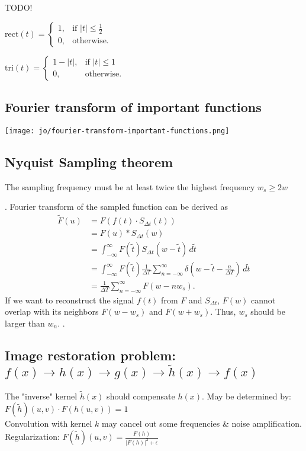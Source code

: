 TODO!

$\text{rect}(t) = \begin{cases} 1, & \text{if } |t| \leq \frac{1}{2} \\ 0, & \text{otherwise.} \end{cases}$

$\text{tri}(t) = \begin{cases} 1 - |t|, & \text{if } |t| \leq 1 \\ 0, & \text{otherwise.} \end{cases}$

\subsection*{Fourier transform of important functions}
\texttt{[image: jo/fourier-transform-important-functions.png]}
\subsection*{Nyquist Sampling theorem}
The sampling frequency must be at least twice the highest frequency $w_s \geq 2 w$ 

 . Fourier transform of the sampled function can be derived as
\begin{align*}
    \tilde{F}(u) &= F(f(t) \cdot S_{\Delta t}(t)) \\
                 &= F(u) * S_{\Delta t}(w) \\
                 &= \int_{-\infty}^{\infty} F(\tilde{t}) S_{\Delta t}(w - \tilde{t}) \, d\tilde{t} \\
                 &= \int_{-\infty}^{\infty} F(\tilde{t}) \frac{1}{\Delta T} \sum_{n = -\infty}^{\infty} \delta (w - \tilde{t} - \frac{n}{\Delta T}) \, d\tilde{t} \\
                 &= \frac{1}{\Delta T} \sum_{n = -\infty}^{\infty} F(w - n w_s).
\end{align*}
If we want to reconstruct the signal $f(t)$ from $F$ and $S_{\Delta t}$, $F(w)$ cannot overlap with its neighbors $F(w - w_s)$ and $F(w + w_s)$. Thus, $w_s$ should be larger than $w_n$. .
\subsection*{Image restoration problem: $f(x) \rightarrow h(x) \rightarrow g(x) \rightarrow \tilde{h}(x) \rightarrow f(x)$}
The "inverse" kernel $\tilde{h}(x)$ should compensate $h(x)$. May be determined by: $F(\tilde{h})(u, v) \cdot F(h(u, v)) = 1$\\
 Convolution with kernel $k$ may cancel out some frequencies \& noise amplification. \\
 Regularization: $F(\tilde{h})(u, v) = \frac{F(h)}{{|F(h)|}^{2} + \epsilon}$ 
